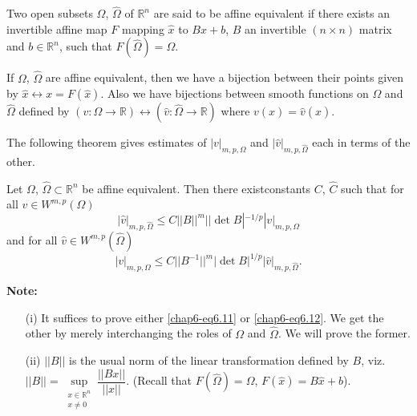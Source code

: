 \begin{definition}\label{chap6-defi6.2}
Two open subsets $\Omega$, $\hat{\Omega}$ of $\mathbb{R}^{n}$ are said
to be affine equivalent if there exists an invertible affine map $F$
mapping $\hat{x}$ to $B\hat{x}+b$, $B$ an invertible $(n\times n)$
matrix and $b\in \mathbb{R}^{n}$, such that $F(\hat{\Omega})=\Omega$. 
\end{definition}

If $\Omega$, $\hat{\Omega}$ are affine equivalent, then we have a
bijection between their points given by $\hat{x}\leftrightarrow
x=F(\hat{x})$. Also we have bijections between smooth functions on
$\Omega$ and $\hat{\Omega}$ defined by $(v:\Omega\to
\mathbb{R})\leftrightarrow (\hat{v}:\hat{\Omega}\to \mathbb{R})$ where
$v(x)=\hat{v}(\hat{x})$. 

The following theorem gives estimates of $|v|_{m,p,\Omega}$ and
$|\hat{v}|_{m,p,\hat{\Omega}}$ each in terms of the other.

\begin{theorem}\label{chap6-thm6.4}
Let $\Omega$, $\hat{\Omega}\subset \mathbb{R}^{n}$ be affine
equivalent. Then there exist\pageoriginale constants $C$, $\hat{C}$
such that for all $v\in W^{m,p}(\Omega)$
\begin{equation*}
|\hat{v}|_{m,p,\hat{\Omega}}\leq C||B||^{m}||\det
B|^{-1/p}|v|_{m,p,\Omega}\tag{6.11}\label{chap6-eq6.11} 
\end{equation*}
and for all $\hat{v}\in W^{m,p}(\hat{\Omega})$
\begin{equation*}
|v|_{m,p,\Omega}\leq C||B^{-1}||^{m}|\det
B|^{1/p}|\hat{v}|_{m,p,\hat{\Omega}}.\tag{6.12}\label{chap6-eq6.12} 
\end{equation*}
\end{theorem}

\noindent
{\bf Note:}
\begin{itemize}
\item[(i)] It suffices to prove either \eqref{chap6-eq6.11} or
  \eqref{chap6-eq6.12}. We get the other by merely interchanging the
  roles of $\Omega$ and $\hat{\Omega}$. We will prove the former.

\item[(ii)] $||B||$ is the usual norm of the linear transformation
  defined by $B$, viz.\@
  $||B||=\sup\limits_{\substack{x\in\mathbb{R}^{n}\\ x\neq
      0}}\dfrac{||Bx||}{||x||}$. (Recall that
  $F(\hat{\Omega})=\Omega$, $F(\hat{x})=B\hat{x}+b$). 
\end{itemize}

